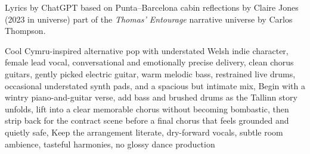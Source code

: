 
\begin{notes}
Lyrics by ChatGPT based on Punta--Barcelona cabin reflections by Claire Jones (2023 in universe) %
part of the \emph{Thomas’ Entourage} narrative universe by Carlos Thompson.
\end{notes}
\begin{style}
Cool Cymru-inspired alternative pop with understated Welsh indie character, female lead vocal, conversational and emotionally precise delivery, clean chorus guitars, gently picked electric guitar, warm melodic bass, restrained live drums, occasional understated synth pads, and a spacious but intimate mix, Begin with a wintry piano-and-guitar verse, add bass and brushed drums as the Tallinn story unfolds, lift into a clear memorable chorus without becoming bombastic, then strip back for the contract scene before a final chorus that feels grounded and quietly safe, Keep the arrangement literate, dry-forward vocals, subtle room ambience, tasteful harmonies, no glossy dance production
\end{style}
